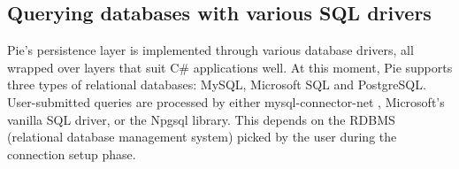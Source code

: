 \subsection{Querying databases with various SQL drivers}

Pie's persistence layer is implemented through various database drivers, all wrapped over layers that suit C\# applications well. At this moment, Pie supports three types of relational databases: MySQL, Microsoft SQL and PostgreSQL. User-submitted queries are processed by either mysql-connector-net \cite{mysql-driver}, Microsoft's vanilla SQL driver, or the Npgsql \cite{npgsql-driver} library. This depends on the RDBMS (relational database management system) picked by the user during the connection setup phase.